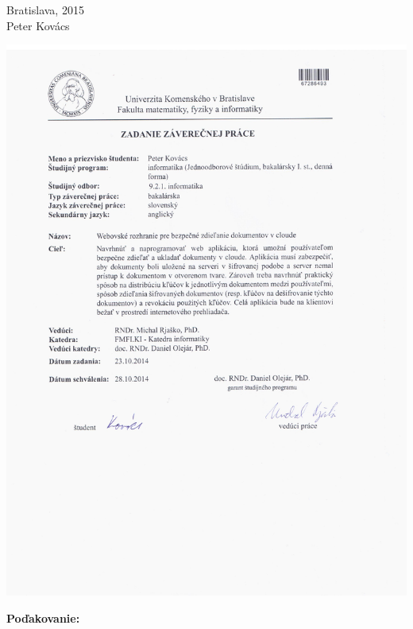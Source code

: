 \documentclass[12pt, oneside]{book}
\def\mfyear{2015}
\def\mfauthor{Peter Kovács}
\def\mfplacedate{Bratislava, \mfyear}
\begin{document}
\noindent \mfplacedate\\
\indent\mfauthor

\eject %





\newpage 
\thispagestyle{empty}
\hspace{-1cm}\includegraphics[width=1.2\textwidth]{images/bcpeto}


\frontmatter

\newpage 
\thispagestyle{empty}

\vfill
{\bf Poďakovanie:}
\end{document}
